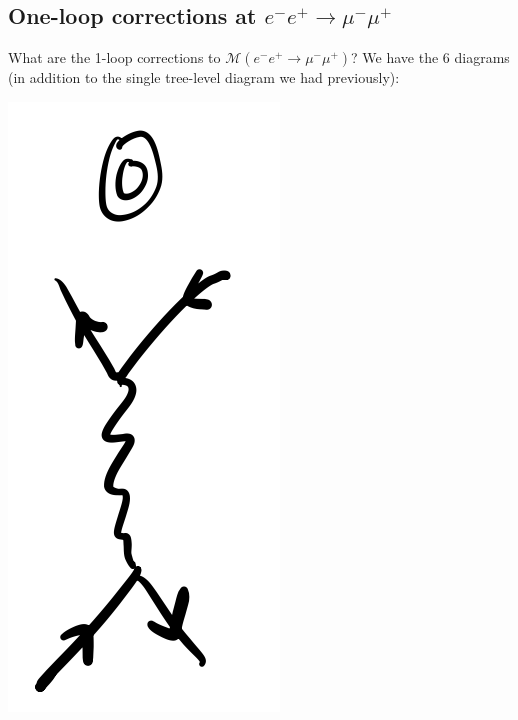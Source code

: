 \subsection{One-loop corrections at $e^-e^+ \to \mu^-\mu^+$}
What are the 1-loop corrections to $\mathcal{M}(e^-e^+ \to \mu^-\mu^+)$? We have the 6 diagrams (in addition to the single tree-level diagram we had previously):
\begin{center}
    \includegraphics[scale=0.35]{Lectures/Images/lec14-treediagram.png}
\end{center}
